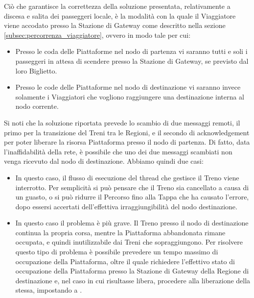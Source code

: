 	Ciò che garantisce la correttezza della soluzione presentata, relativamente a discesa e salita dei passeggeri locale, è la modalità con la quale il Viaggiatore viene accodato presso la Stazione di Gateway come descritto nella sezione \ref{subsec:percorrenza_viaggiatore}, ovvero in modo tale per cui:
	\begin{itemize}
		\item Presso le coda  delle Piattaforme nel nodo di partenza vi saranno tutti e soli i passeggeri in attesa di scendere presso la Stazione di Gateway, se previsto dal loro Biglietto.
		\item Presso le code  delle Piattaforme nel nodo di destinazione vi saranno invece solamente i Viaggiatori che vogliono raggiungere una destinazione interna al nodo corrente.
	\end{itemize}  
	Si noti che la soluzione riportata prevede lo scambio di due messaggi remoti, il primo per la transizione del Treni tra le Regioni, e il secondo di acknowledgement per poter liberare la risorsa Piattaforma presso il nodo di partenza. Di fatto, data l'inaffidabilità della rete, è possibile che uno dei due messaggi scambiati non venga ricevuto dal nodo di destinazione. Abbiamo quindi due casi:
		\begin{itemize}
			\item {} In questo caso, il flusso di esecuzione del thread che gestisce il Treno viene interrotto. Per semplicità si può pensare che il Treno sia cancellato a causa di un guasto, o si può ridurre il Percorso fino alla Tappa che ha causato l'errore, dopo essersi accertati dell'effettiva irraggiungibilità del nodo destinazione.
			\item {} In questo caso il problema è più grave. Il Treno presso il nodo di destinazione continua la propria corsa, mentre la Piattaforma abbandonata rimane occupata, e quindi inutilizzabile dai Treni che sopraggiungono. Per risolvere questo tipo di problema è possibile prevedere un tempo massimo di occupazione della Piattaforma, oltre il quale richiedere l'effettivo stato di occupazione della Piattaforma presso la Stazione di Gateway della Regione di destinazione e, nel caso in cui risultasse libera, procedere alla liberazione della stessa, impostando  a . 
		\end{itemize}
	 
	

